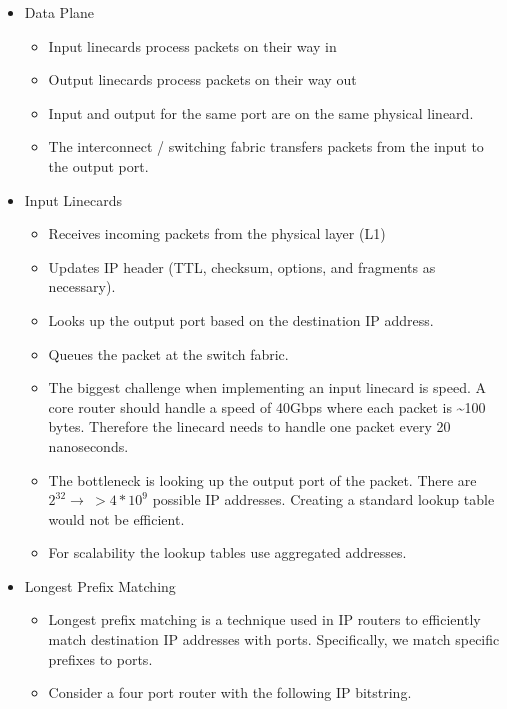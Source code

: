 \begin{itemize}
\tightlist
\item
  Data Plane

  \begin{itemize}
  \tightlist
  \item
    Input linecards process packets on their way in
  \item
    Output linecards process packets on their way out
  \item
    Input and output for the same port are on the same physical lineard.
  \item
    The interconnect / switching fabric transfers packets from the input
    to the output port.
  \end{itemize}
\item
  Input Linecards

  \begin{itemize}
  \tightlist
  \item
    Receives incoming packets from the physical layer (L1)
  \item
    Updates IP header (TTL, checksum, options, and fragments as
    necessary).
  \item
    Looks up the output port based on the destination IP address.
  \item
    Queues the packet at the switch fabric.
  \item
    The biggest challenge when implementing an input linecard is speed.
    A core router should handle a speed of 40Gbps where each packet is
    \textasciitilde{}100 bytes. Therefore the linecard needs to handle
    one packet every 20 nanoseconds.
  \item
    The bottleneck is looking up the output port of the packet. There
    are \(2^32 \to \ > 4 * 10^9\) possible IP addresses. Creating a
    standard lookup table would not be efficient.
  \item
    For scalability the lookup tables use aggregated addresses.
  \end{itemize}
\item
  Longest Prefix Matching

  \begin{itemize}
  \tightlist
  \item
    Longest prefix matching is a technique used in IP routers to
    efficiently match destination IP addresses with ports. Specifically,
    we match specific prefixes to ports.
  \item
    Consider a four port router with the following IP bitstring.
  \end{itemize}


\end{itemize}
